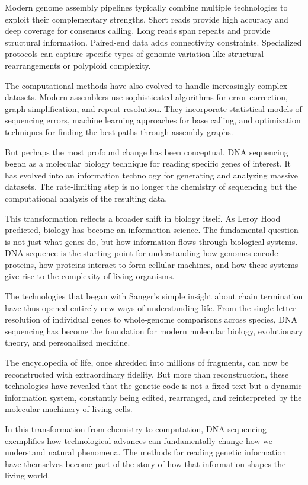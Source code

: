 Modern genome assembly pipelines typically combine multiple technologies to exploit their complementary strengths. Short reads provide high accuracy and deep coverage for consensus calling. Long reads span repeats and provide structural information. Paired-end data adds connectivity constraints. Specialized protocols can capture specific types of genomic variation like structural rearrangements or polyploid complexity.

The computational methods have also evolved to handle increasingly complex datasets. Modern assemblers use sophisticated algorithms for error correction, graph simplification, and repeat resolution. They incorporate statistical models of sequencing errors, machine learning approaches for base calling, and optimization techniques for finding the best paths through assembly graphs.

But perhaps the most profound change has been conceptual. DNA sequencing began as a molecular biology technique for reading specific genes of interest. It has evolved into an information technology for generating and analyzing massive datasets. The rate-limiting step is no longer the chemistry of sequencing but the computational analysis of the resulting data.

This transformation reflects a broader shift in biology itself. As Leroy Hood predicted, biology has become an information science. The fundamental question is not just what genes do, but how information flows through biological systems. DNA sequence is the starting point for understanding how genomes encode proteins, how proteins interact to form cellular machines, and how these systems give rise to the complexity of living organisms.

The technologies that began with Sanger's simple insight about chain termination have thus opened entirely new ways of understanding life. From the single-letter resolution of individual genes to whole-genome comparisons across species, DNA sequencing has become the foundation for modern molecular biology, evolutionary theory, and personalized medicine.

The encyclopedia of life, once shredded into millions of fragments, can now be reconstructed with extraordinary fidelity. But more than reconstruction, these technologies have revealed that the genetic code is not a fixed text but a dynamic information system, constantly being edited, rearranged, and reinterpreted by the molecular machinery of living cells.

In this transformation from chemistry to computation, DNA sequencing exemplifies how technological advances can fundamentally change how we understand natural phenomena. The methods for reading genetic information have themselves become part of the story of how that information shapes the living world.

\vspace{2em}
